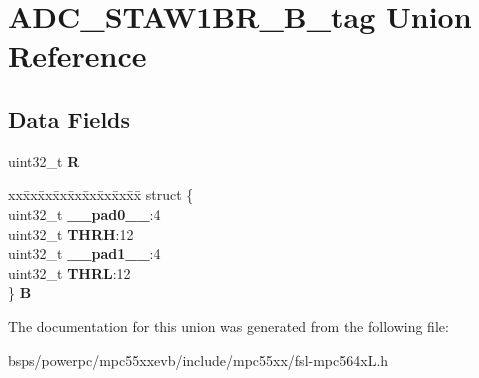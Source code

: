 \hypertarget{unionADC__STAW1BR__32B__tag}{}\section{A\+D\+C\+\_\+\+S\+T\+A\+W1\+B\+R\+\_\+B\+\_\+tag Union Reference}
\label{unionADC__STAW1BR__32B__tag}
\subsection*{Data Fields}
\begin{DoxyCompactItemize}
\item 
\mbox{\label{unionADC__STAW1BR__32B__tag_ae416162b9a8238f56f8e867bb5ca7bc3}} 
uint32\+\_\+t {\bfseries R}
\item 
\mbox{\label{unionADC__STAW1BR__32B__tag_aee7d4d630fde5323609b0d15325a1b29}} 
\begin{tabbing}
xx\=xx\=xx\=xx\=xx\=xx\=xx\=xx\=xx\=\kill
struct \{\\
\>uint32\_t {\bfseries \_\_pad0\_\_}:4\\
\>uint32\_t {\bfseries THRH}:12\\
\>uint32\_t {\bfseries \_\_pad1\_\_}:4\\
\>uint32\_t {\bfseries THRL}:12\\
\} {\bfseries B}\\

\end{tabbing}\end{DoxyCompactItemize}


The documentation for this union was generated from the following file\+:\begin{DoxyCompactItemize}
\item 
bsps/powerpc/mpc55xxevb/include/mpc55xx/fsl-\/mpc564x\+L.\+h\end{DoxyCompactItemize}
